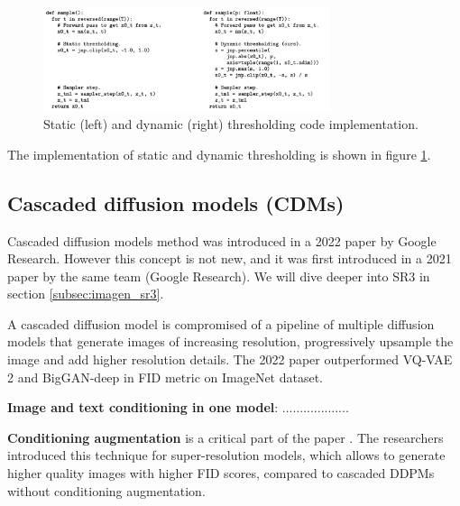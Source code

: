 \begin{figure}
    \centering
    \includegraphics[width=0.75\textwidth]{images/imagen/static_dynamic_thresholding.png}
    \caption{Static (left) and dynamic (right) thresholding code implementation.}
    \label{fig:dynamic_thresholding}
\end{figure}

The implementation of static and dynamic thresholding is shown in figure \ref{fig:dynamic_thresholding}.










\subsection{Cascaded diffusion models (CDMs)}

Cascaded diffusion models method was introduced in a 2022 paper \cite{cascaded_diffusion_models} by Google Research. However this concept is not new, and it was first introduced in a 2021 paper \cite{sr3} by the same team (Google Research). We will dive deeper into SR3 in section \ref{subsec:imagen_sr3}.

A cascaded diffusion model is compromised of a pipeline of multiple diffusion models that generate images of increasing resolution, progressively upsample the image and add higher resolution details. The 2022 paper \cite{cascaded_diffusion_models} outperformed VQ-VAE 2 \cite{vqvae2} and BigGAN-deep \cite{biggan_deep} in FID metric on ImageNet dataset.

\textbf{Image and text conditioning in one model}: ...................

\textbf{Conditioning augmentation} is a critical part of the paper \cite{cascaded_diffusion_models}. The researchers introduced this technique for super-resolution models, which allows to generate higher quality images with higher FID scores, compared to cascaded DDPMs without conditioning augmentation. 














